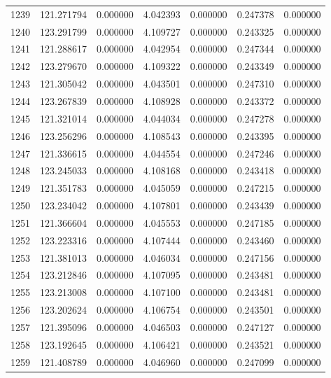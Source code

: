 \begin{tabular}{rrrrrrr}
1239 & 121.271794 &    0.000000 &  4.042393 &   0.000000 &   0.247378 &  0.000000 \\
1240 & 123.291799 &    0.000000 &  4.109727 &   0.000000 &   0.243325 &  0.000000 \\
1241 & 121.288617 &    0.000000 &  4.042954 &   0.000000 &   0.247344 &  0.000000 \\
1242 & 123.279670 &    0.000000 &  4.109322 &   0.000000 &   0.243349 &  0.000000 \\
1243 & 121.305042 &    0.000000 &  4.043501 &   0.000000 &   0.247310 &  0.000000 \\
1244 & 123.267839 &    0.000000 &  4.108928 &   0.000000 &   0.243372 &  0.000000 \\
1245 & 121.321014 &    0.000000 &  4.044034 &   0.000000 &   0.247278 &  0.000000 \\
1246 & 123.256296 &    0.000000 &  4.108543 &   0.000000 &   0.243395 &  0.000000 \\
1247 & 121.336615 &    0.000000 &  4.044554 &   0.000000 &   0.247246 &  0.000000 \\
1248 & 123.245033 &    0.000000 &  4.108168 &   0.000000 &   0.243418 &  0.000000 \\
1249 & 121.351783 &    0.000000 &  4.045059 &   0.000000 &   0.247215 &  0.000000 \\
1250 & 123.234042 &    0.000000 &  4.107801 &   0.000000 &   0.243439 &  0.000000 \\
1251 & 121.366604 &    0.000000 &  4.045553 &   0.000000 &   0.247185 &  0.000000 \\
1252 & 123.223316 &    0.000000 &  4.107444 &   0.000000 &   0.243460 &  0.000000 \\
1253 & 121.381013 &    0.000000 &  4.046034 &   0.000000 &   0.247156 &  0.000000 \\
1254 & 123.212846 &    0.000000 &  4.107095 &   0.000000 &   0.243481 &  0.000000 \\
1255 & 123.213008 &    0.000000 &  4.107100 &   0.000000 &   0.243481 &  0.000000 \\
1256 & 123.202624 &    0.000000 &  4.106754 &   0.000000 &   0.243501 &  0.000000 \\
1257 & 121.395096 &    0.000000 &  4.046503 &   0.000000 &   0.247127 &  0.000000 \\
1258 & 123.192645 &    0.000000 &  4.106421 &   0.000000 &   0.243521 &  0.000000 \\
1259 & 121.408789 &    0.000000 &  4.046960 &   0.000000 &   0.247099 &  0.000000 \\

\end{tabular}
